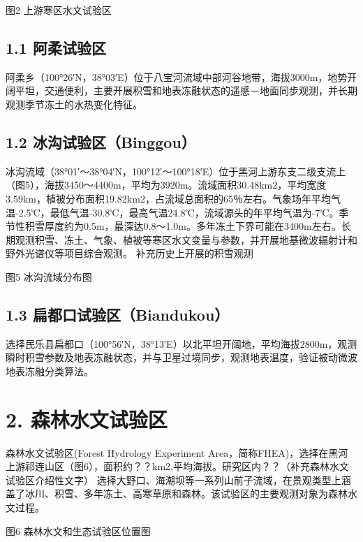 \documentclass[letterpaper,10pt,english]{sphinxmanual}
\begin{document}
图2 上游寒区水文试验区


\subsection{1.1 阿柔试验区}
\label{water_experiment_area:id3}
阿柔乡（100°26′N，38°03′E）位于八宝河流域中部河谷地带，海拔3000m，地势开阔平坦，交通便利，主要开展积雪和地表冻融状态的遥感－地面同步观测，并长期观测季节冻土的水热变化特征。


\subsection{1.2 冰沟试验区（Binggou）}
\label{water_experiment_area:binggou}
冰沟流域（38°01′～38°04′N，100°12′～100°18′E）位于黑河上游东支二级支流上（图5），海拔3450～4400m，平均为3920m。流域面积30.48km2，平均宽度3.59km，植被分布面积19.82km2，占流域总面积的65％左右。气象场年平均气温-2.5℃，最低气温-30.8℃，最高气温24.8℃，流域源头的年平均气温为-7℃。季节性积雪厚度约为0.5m，最深达0.8～1.0m。多年冻土下界可能在3400m左右。长期观测积雪、冻土、气象、植被等寒区水文变量与参数，并开展地基微波辐射计和野外光谱仪等项目综合观测。
补充历史上开展的积雪观测

图5 冰沟流域分布图


\subsection{1.3 扁都口试验区（Biandukou）}
\label{water_experiment_area:biandukou}
选择民乐县扁都口（100°56′N，38°13′E）以北平坦开阔地，平均海拔2800m，观测瞬时积雪参数及地表冻融状态，并与卫星过境同步，观测地表温度，验证被动微波地表冻融分类算法。


\section{2. 森林水文试验区}
\label{water_experiment_area:id4}
森林水文试验区(Forest Hydrology Experiment Area，简称FHEA)，选择在黑河上游祁连山区（图6），面积约？？km2,平均海拔。研究区内？？（补充森林水文试验区介绍性文字）
选择大野口、海潮坝等一系列山前子流域，在景观类型上涵盖了冰川、积雪、多年冻土、高寒草原和森林。该试验区的主要观测对象为森林水文过程。

图6 森林水文和生态试验区位置图
\end{document}
